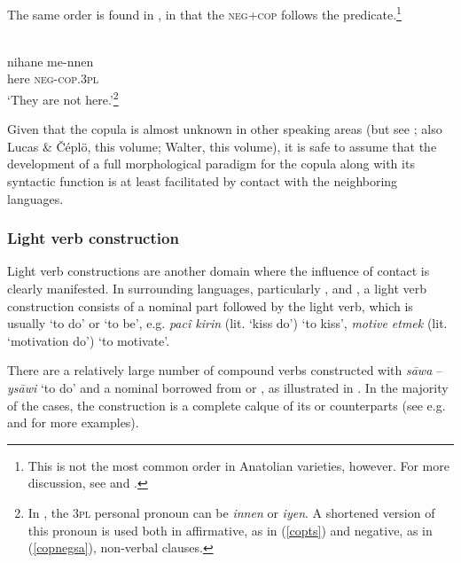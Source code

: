 \documentclass[output=paper]{langsci/langscibook}
\begin{document}
\noindent  The same order is found in  , in that the \textsc{neg+cop} follows the predicate.\footnote{This is not the most common order in Anatolian  varieties, however. For more discussion, see \cite{Jastrow2011anatolian} and \cite{Akkus2016,Akkus2017}.}

\begin{exe}
\ex\label{copnegsa}  \\
\gll nihane me-nnen	\\
here 	\textsc{neg-cop.3pl} \\
        \glt `They are not here.'\footnote{In  , the 3\textsc{pl} personal pronoun can be \textit{innen} or \textit{iyen}. A shortened version of this pronoun is used both in affirmative, as in (\ref{copts}) and negative, as in (\ref{copnegsa}), non-verbal clauses. }
\end{exe}

\noindent Given that the {copula} is almost unknown in other  speaking areas (but see \citealt{Blanc1964}; also Lucas \& Čéplö, this volume; Walter, this volume), it is safe to assume that the development of a full morphological paradigm for the {copula} along with its syntactic function is at least facilitated by contact with the neighboring languages.


\subsubsection{Light verb construction}


Light verb constructions are another domain where the influence of contact is clearly manifested. In surrounding languages, particularly ,  and , a {light verb} construction consists of a nominal part followed by the {light verb}, which is usually `to do' or `to be', e.g.  \textit{pacî kirin} (lit. `kiss do') `to kiss',  \textit{motive etmek} (lit. `motivation do') `to motivate’.

There are a relatively large number of compound verbs constructed with  \textit{s\={a}wa} – \textit{ys\={a}wi} `to do' and a nominal borrowed from  or , as illustrated in . In the majority of the cases, the construction is a complete {calque} of its  or  counterparts (see e.g. \citealt{Versteegh1997,Lahdo2009,Grigore2007article,Talay2007,Jastrow2011anatolian,Akkus2016,Akkus2017,AkkusBenmamoun2018} and \citealt{Bituna2016} for more examples).
\end{document}
